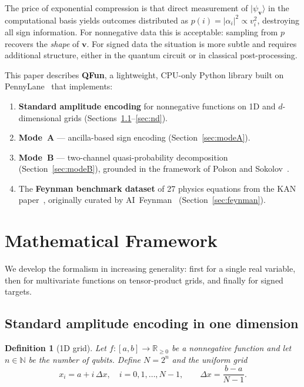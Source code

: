 \documentclass[11pt]{article}
\newtheorem{definition}{Definition}
\newcommand{\ket}[1]{|#1\rangle}
\newcommand{\R}{\mathbb{R}}
\begin{document}
The price of exponential compression is that direct measurement of
$\ket{\psi_{\bm{v}}}$ in the computational basis yields outcomes
distributed as $p(i)=|\alpha_i|^2\propto v_i^2$, destroying all sign
information.  For nonnegative data this is acceptable: sampling from
$p$ recovers the \emph{shape} of $\bm{v}$.  For signed data the
situation is more subtle and requires additional structure, either in
the quantum circuit or in classical post-processing.

This paper describes \textbf{QFun}, a lightweight, CPU-only Python
library built on PennyLane~\cite{bergholm2020pennylane} that
implements:
\begin{enumerate}
  \item \textbf{Standard amplitude encoding} for nonnegative functions
        on 1D and $d$-dimensional grids
        (Sections~\ref{sec:1d}--\ref{sec:nd}).
  \item \textbf{Mode~A} --- ancilla-based sign encoding
        (Section~\ref{sec:modeA}).
  \item \textbf{Mode~B} --- two-channel quasi-probability
        decomposition (Section~\ref{sec:modeB}), grounded in the
        framework of Polson and
        Sokolov~\cite{polson2024negative}.
  \item The \textbf{Feynman benchmark dataset} of 27 physics
        equations from the KAN paper~\cite{liu2024kan}, originally
        curated by AI~Feynman~\cite{udrescu2020aifeynman}
        (Section~\ref{sec:feynman}).
\end{enumerate}

\section{Mathematical Framework}
\label{sec:math}

We develop the formalism in increasing generality: first for a single
real variable, then for multivariate functions on tensor-product grids,
and finally for signed targets.

\subsection{Standard amplitude encoding in one dimension}
\label{sec:1d}

\begin{definition}[1D grid]\label{def:grid1d}
Let $f:[a,b]\to\R_{\ge 0}$ be a nonnegative function and let
$n\in\mathbb{N}$ be the number of qubits.  Define $N=2^n$ and the
\emph{uniform grid}
\begin{equation}\label{eq:grid}
  x_i = a + i\,\Delta x,\quad i=0,1,\ldots,N-1,
  \qquad \Delta x = \frac{b-a}{N-1}.
\end{equation}
\end{definition}
\end{document}
